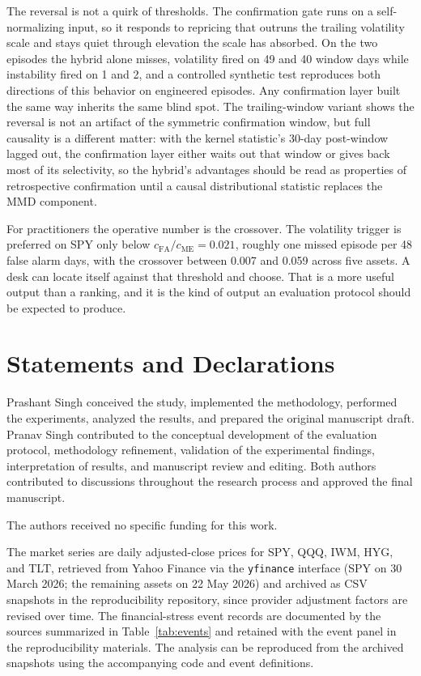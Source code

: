 \documentclass[pdflatex,sn-mathphys-num,iicol]{sn-jnl}
\begin{document}
The reversal is not a quirk of thresholds. The confirmation gate runs on a self-normalizing input, so it responds to repricing that outruns the trailing volatility scale and stays quiet through elevation the scale has absorbed. On the two episodes the hybrid alone misses, volatility fired on 49 and 40 window days while instability fired on 1 and 2, and a controlled synthetic test reproduces both directions of this behavior on engineered episodes. Any confirmation layer built the same way inherits the same blind spot. The trailing-window variant shows the reversal is not an artifact of the symmetric confirmation window, but full causality is a different matter: with the kernel statistic's 30-day post-window lagged out, the confirmation layer either waits out that window or gives back most of its selectivity, so the hybrid's advantages should be read as properties of retrospective confirmation until a causal distributional statistic replaces the MMD component.

For practitioners the operative number is the crossover. The volatility trigger is preferred on SPY only below $c_{\mathrm{FA}}/c_{\mathrm{ME}}=0.021$, roughly one missed episode per 48 false alarm days, with the crossover between 0.007 and 0.059 across five assets. A desk can locate itself against that threshold and choose. That is a more useful output than a ranking, and it is the kind of output an evaluation protocol should be expected to produce.

\backmatter

\section*{Statements and Declarations}


Prashant Singh conceived the study, implemented the methodology, performed the experiments, analyzed the results, and prepared the original manuscript draft. Pranav Singh contributed to the conceptual development of the evaluation protocol, methodology refinement, validation of the experimental findings, interpretation of results, and manuscript review and editing. Both authors contributed to discussions throughout the research process and approved the final manuscript.


The authors received no specific funding for this work.

The market series are daily adjusted-close prices for SPY, QQQ, IWM, HYG, and TLT, retrieved from Yahoo Finance via the \texttt{yfinance} interface (SPY on 30 March 2026; the remaining assets on 22 May 2026) and archived as CSV snapshots in the reproducibility repository, since provider adjustment factors are revised over time. The financial-stress event records are documented by the sources summarized in Table~\ref{tab:events} and retained with the event panel in the reproducibility materials. The analysis can be reproduced from the archived snapshots using the accompanying code and event definitions.
\end{document}
